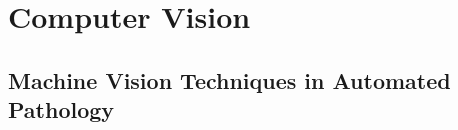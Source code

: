 \chapter{Computer Vision}

%
%
%
%
%
%
%
%
%
%

\section{Machine Vision Techniques in Automated Pathology}

